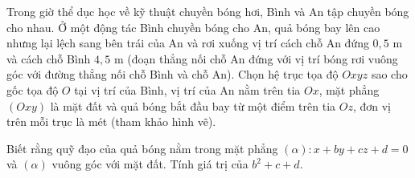 \begin{ex}
Trong giờ thể dục học về kỹ thuật chuyền bóng hơi, Bình và An tập chuyền bóng cho nhau. Ở một động tác Bình chuyền bóng cho An, quả bóng bay lên cao nhưng lại lệch sang bên trái của An và rơi xuống vị trí cách chỗ An đứng $0{,}5$ m và cách chỗ Bình $4{,}5$ m (đoạn thẳng nối chỗ An đứng với vị trí bóng rơi vuông góc với đường thẳng nối chỗ Bình và chỗ An). Chọn hệ trục tọa độ $Oxyz$ sao cho gốc tọa độ $O$ tại vị trí của Bình, vị trí của An nằm trên tia $Ox$, mặt phẳng $(Oxy)$ là mặt đất và quả bóng bắt đầu bay từ một điểm trên tia $Oz$, đơn vị trên mỗi trục là mét (tham khảo hình vẽ).
\begin{center}
\end{center}
Biết rằng quỹ đạo của quả bóng nằm trong mặt phẳng $(\alpha)\colon x+by+cz+d=0$ và $(\alpha)$ vuông góc với mặt đất. Tính giá trị của $b^2+c+d$.
\end{ex}

